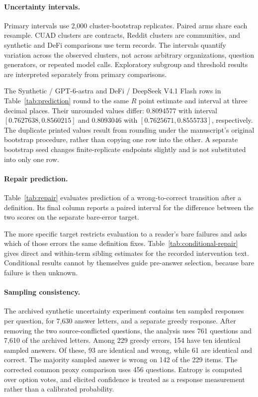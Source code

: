 \paragraph{Uncertainty intervals.}
Primary intervals use 2,000 cluster-bootstrap replicates. Paired arms share each resample. CUAD clusters are contracts, Reddit clusters are communities, and synthetic and DeFi comparisons use term records. The intervals quantify variation across the observed clusters, not across arbitrary organizations, question generators, or repeated model calls. Exploratory subgroup and threshold results are interpreted separately from primary comparisons.

The Synthetic / GPT-6-astra and DeFi / DeepSeek V4.1 Flash rows in Table~\ref{tab:prediction} round to the same $R$ point estimate and interval at three decimal places. Their unrounded values differ: 0.8094577 with interval $[0.7627638,0.8560215]$ and 0.8093046 with $[0.7625671,0.8555733]$, respectively. The duplicate printed values result from rounding under the manuscript's original bootstrap procedure, rather than copying one row into the other. A separate bootstrap seed changes finite-replicate endpoints slightly and is not substituted into only one row.

\paragraph{Repair prediction.}
Table~\ref{tab:repair} evaluates prediction of a wrong-to-correct transition after a definition. Its final column reports a paired interval for the difference between the two scores on the separate bare-error target.


The more specific target restricts evaluation to a reader's bare failures and asks which of those errors the same definition fixes. Table~\ref{tab:conditional-repair} gives direct and within-term sibling estimates for the recorded intervention text. Conditional results cannot by themselves guide pre-answer selection, because bare failure is then unknown.




\paragraph{Sampling consistency.}
The archived synthetic uncertainty experiment contains ten sampled responses per question, for 7,630 answer letters, and a separate greedy response. After removing the two source-conflicted questions, the analysis uses 761 questions and 7,610 of the archived letters. Among 229 greedy errors, 154 have ten identical sampled answers. Of these, 93 are identical and wrong, while 61 are identical and correct. The majority sampled answer is wrong on 142 of the 229 items. The corrected common proxy comparison uses 456 questions. Entropy is computed over option votes, and elicited confidence is treated as a response measurement rather than a calibrated probability.


